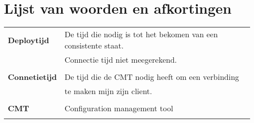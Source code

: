 


\chapter*{Lijst van woorden en afkortingen}

\begin{tabular}{l  l }
\textbf{Deploytijd} & De tijd die nodig is tot het bekomen van een consistente staat. \\ &Connectie tijd niet meegerekend. \\ \\
\textbf{Connetietijd} & De tijd die de CMT nodig heeft om een verbinding \\ & te maken mijn zijn client. \\ \\
\textbf{CMT} & Configuration management tool \\ \\
\end{tabular}